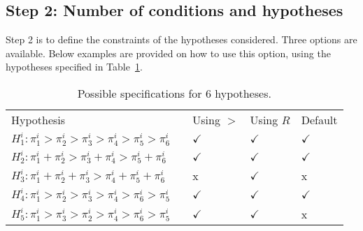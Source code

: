 \documentclass[11pt, fullpage, a4paper]{article}
\begin{document}
	\subsection{Step 2: Number of conditions and hypotheses}
\label{subsec:constraints}	
	Step 2 is to define the constraints of the hypotheses considered.
	Three options are available.
		Below examples are provided on how to use this option, using the hypotheses specified in Table~\ref{tab:hypotheses}.
			\begin{table}[b]
				\caption{Possible specifications for 6 hypotheses.}
				\label{tab:hypotheses}
				\begin{tabular}{l l l l l }
					Hypothesis & & Using $>$ & Using $R$ & Default \\
					$H_{1}^{i}: \pi_{1}^{i} >  \pi_{2}^{i} >  \pi_{3}^{i} >  \pi_{4}^{i}>  \pi_{5}^{i} >  \pi_{6}^{i}$ && $\checkmark$ & $\checkmark$ & $\checkmark$ \\
					
					$H_{2}^{i}: \pi_{1}^{i} + \pi_{2}^{i} >  \pi_{3}^{i} + \pi_{4}^{i}>  \pi_{5}^{i} + \pi_{6}^{i}$ && $\checkmark$ &$\checkmark$ &$\checkmark$\\
					
					$H_{3}^{i}: \pi_{1}^{i} + \pi_{2}^{i} + \pi_{3}^{i} > \pi_{4}^{i} + \pi_{5}^{i} + \pi_{6}^{i}$  && x &$\checkmark$ &x\\
					
					$H_{4}^{i}:  \pi_{1}^{i} >  \pi_{2}^{i} >  \pi_{3}^{i} >  \pi_{4}^{i}>  \pi_{6}^{i} >  \pi_{5}^{i}$  && $\checkmark$ &$\checkmark$ &$\checkmark$\\
					
					$H_{5}^{i}:  \pi_{1}^{i} >  \pi_{3}^{i} >  \pi_{2}^{i} >  \pi_{4}^{i}>  \pi_{6}^{i} >  \pi_{5}^{i}$  && $\checkmark$ &$\checkmark$ &x\\	
					
				\end{tabular}
			\end{table}
\end{document}
